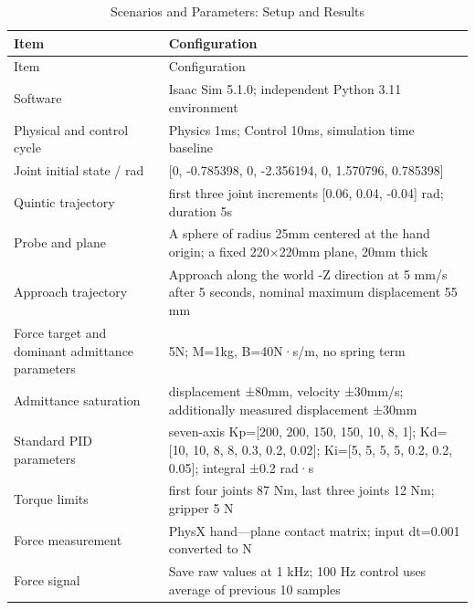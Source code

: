 \FloatBarrier\begingroup\small\setlength{\tabcolsep}{2.5pt}
\begin{longtable}[]{@{}
  >{\raggedright\arraybackslash}p{}
  >{\raggedright\arraybackslash}p{}@{}}
\caption{Scenarios and Parameters: Setup and Results}\label{tab:s11-1}\tabularnewline
\toprule\noalign{}
\begin{minipage}[b]{\linewidth}\raggedright
Item
\end{minipage} & \begin{minipage}[b]{\linewidth}\raggedright
Configuration
\end{minipage} \\
\midrule\noalign{}
\endfirsthead
\toprule\noalign{}
\begin{minipage}[b]{\linewidth}\raggedright
Item
\end{minipage} & \begin{minipage}[b]{\linewidth}\raggedright
Configuration
\end{minipage} \\
\midrule\noalign{}
\endhead
\bottomrule\noalign{}
\endlastfoot
Software & Isaac Sim 5.1.0; independent Python 3.11 environment \\
Physical and control cycle & Physics 1ms; Control 10ms, simulation time baseline \\
Joint initial state / rad & {[}0, -0.785398, 0, -2.356194, 0, 1.570796, 0.785398{]} \\
Quintic trajectory & first three joint increments {[}0.06, 0.04, -0.04{]} rad; duration 5s \\
Probe and plane & A sphere of radius 25mm centered at the hand origin; a fixed 220\(\times\)220mm plane, 20mm thick \\
Approach trajectory & Approach along the world -Z direction at 5 mm/s after 5 seconds, nominal maximum displacement 55 mm \\
Force target and dominant admittance parameters & 5N; M=1kg, B=40N·s/m, no spring term \\
Admittance saturation & displacement ±80mm, velocity ±30mm/s; additionally measured displacement ±30mm \\
Standard PID parameters & seven-axis Kp={[}200, 200, 150, 150, 10, 8, 1{]}; Kd={[}10, 10, 8, 8, 0.3, 0.2, 0.02{]}; Ki={[}5, 5, 5, 5, 0.2, 0.2, 0.05{]}; integral ±0.2 rad·s \\
Torque limits & first four joints 87 Nm, last three joints 12 Nm; gripper 5 N \\
Force measurement & PhysX hand---plane contact matrix; input dt=0.001 converted to N \\
Force signal & Save raw values at 1 kHz; 100 Hz control uses average of previous 10 samples \\
\end{longtable}\endgroup

